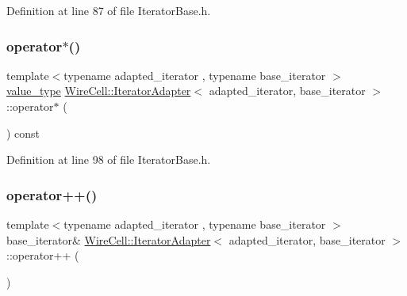 Definition at line 87 of file Iterator\+Base.\+h.

\mbox{\label{class_wire_cell_1_1_iterator_adapter_a50675ee1e3bbf5f351414fbede73520f}} 
\subsubsection{\texorpdfstring{operator$\ast$()}{operator*()}}
{\footnotesize\ttfamily template$<$typename adapted\+\_\+iterator , typename base\+\_\+iterator $>$ \\
\hyperlink{class_wire_cell_1_1_iterator_adapter_a8f7594d66b0d00566f61976bcf4ab13e}{value\+\_\+type} \hyperlink{class_wire_cell_1_1_iterator_adapter}{Wire\+Cell\+::\+Iterator\+Adapter}$<$ adapted\+\_\+iterator, base\+\_\+iterator $>$\+::operator$\ast$ (\begin{DoxyParamCaption}{ }\end{DoxyParamCaption}) const\hspace{0.3cm}{\ttfamily [inline]}}



Definition at line 98 of file Iterator\+Base.\+h.

\mbox{\label{class_wire_cell_1_1_iterator_adapter_a6c8b893a3c7f600fcb2cc567f4ceb8e6}} 
\subsubsection{\texorpdfstring{operator++()}{operator++()}}
{\footnotesize\ttfamily template$<$typename adapted\+\_\+iterator , typename base\+\_\+iterator $>$ \\
base\+\_\+iterator\& \hyperlink{class_wire_cell_1_1_iterator_adapter}{Wire\+Cell\+::\+Iterator\+Adapter}$<$ adapted\+\_\+iterator, base\+\_\+iterator $>$\+::operator++ (\begin{DoxyParamCaption}{ }\end{DoxyParamCaption})\hspace{0.3cm}{\ttfamily [inline]}}



